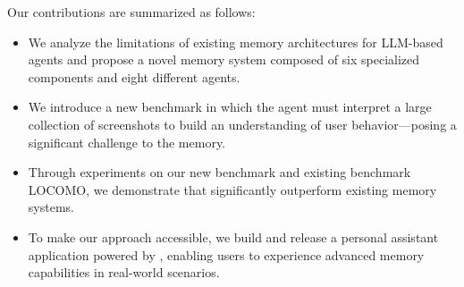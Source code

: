 Our contributions are summarized as follows:
\begin{itemize}[leftmargin=*]
\item We analyze the limitations of existing memory architectures for LLM-based agents and propose a novel memory system composed of six specialized components and eight different agents. 
\item We introduce a new benchmark in which the agent must interpret a large collection of screenshots to build an understanding of user behavior—posing a significant challenge to the memory.
\item Through experiments on our new benchmark and existing benchmark LOCOMO, we demonstrate that \ours significantly outperform existing memory systems.
\item To make our approach accessible, we build and release a personal assistant application powered by \ours, enabling users to experience advanced memory capabilities in real-world scenarios.
\end{itemize}




